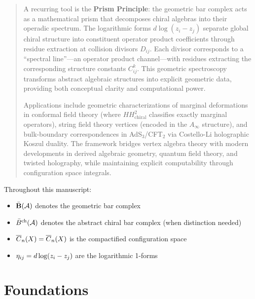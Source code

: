 \documentclass[11pt]{memoir}
\begin{document}
\begin{abstract}
{\medskip
\noindent
A recurring tool is the \textbf{Prism Principle}: the geometric bar complex acts as a mathematical prism that decomposes chiral algebras into their operadic spectrum. The logarithmic forms $d\log(z_i - z_j)$ separate global chiral structure into constituent operator product coefficients through residue extraction at collision divisors $D_{ij}$. Each divisor corresponds to a ``spectral line''---an operator product channel---with residues extracting the corresponding structure constants $C_{ij}^k$. This geometric spectroscopy transforms abstract algebraic structures into explicit geometric data, providing both conceptual clarity and computational power.

\medskip
\noindent
Applications include geometric characterizations of marginal deformations in conformal field theory (where $HH^2_{\text{chiral}}$ classifies exactly marginal operators), string field theory vertices (encoded in the $A_\infty$ structure), and bulk-boundary correspondences in AdS$_3$/CFT$_2$ via Costello-Li holographic Koszul duality. The framework bridges vertex algebra theory with modern developments in derived algebraic geometry, quantum field theory, and twisted holography, while maintaining explicit computability through configuration space integrals.
}
\end{abstract}

\tableofcontents

\medskip
\noindent

\begin{remark}
Throughout this manuscript:
\begin{itemize}
\item $\bar{\mathbf{B}}(\mathcal{A})$ denotes the geometric bar complex
\item $\bar{B}^{\text{ch}}(\mathcal{A})$ denotes the abstract chiral bar complex (when distinction needed)
\item $\overline{C}_{n}(X) = \overline{C}_n(X)$ is the compactified configuration space
\item $\eta_{ij} = d\log(z_i - z_j)$ are the logarithmic 1-forms
\end{itemize}
\end{remark}

\part{Foundations}
\end{document}
